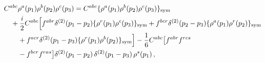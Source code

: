 \begin{align}\label{eq:symord}
&C^{abc}\rho^{a}(p_{1})\rho^{b}(p_{2})\rho^{c}(p_{3})=C^{abc}\{\rho^{a}(p_{1})\rho^{b}(p_{2})\rho^{c}(p_{3})\}_{\rm sym}\notag\\
&\quad +\frac{i}{2}C^{abc}\Big[f^{abr}\delta^{(2)}(p_{1}-p_{2})\{\rho^{r}(p_{1})\rho^{c}(p_{3})\}_{\rm sym} +f^{bcr}\delta^{(2)}(p_{2}-p_{3})\{\rho^{a}(p_{1})\rho^{r}(p_{2})\}_{\rm sym}\notag\\
&\quad\quad +f^{acr}\delta^{(2)}(p_{1}-p_{3})\{\rho^{r}(p_{1})\rho^{b}(p_{2})\}_{\rm sym}\Big] -\frac{1}{6}C^{abc}\big[f^{abr}f^{rcs}\notag\\
&\quad\quad -f^{bcr}f^{ras}\big]\delta^{(2)}(p_{1}-p_{2})\, \delta^{(2)}(p_{1}-p_{3})\, \rho^{s}(p_{1})\,,
\end{align}
